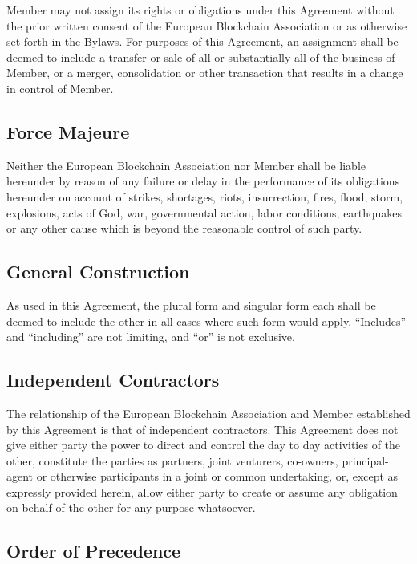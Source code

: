 \documentclass{article}
\begin{document}
Member may not assign its rights or obligations under this Agreement without the prior written consent of the European Blockchain Association or as otherwise set forth in the Bylaws. 
For purposes of this Agreement, an assignment shall be deemed to include a transfer or sale of all or substantially all of the business of Member, or a merger, consolidation or other transaction that results in a change in control of Member.

\subsection{Force Majeure}

Neither the European Blockchain Association nor Member shall be liable hereunder by reason of any failure or delay in the performance of its obligations hereunder on account of strikes, shortages, riots, insurrection, fires, flood, storm, explosions, acts of God, war, governmental action, labor conditions, earthquakes or any other cause which is beyond the reasonable control of such party.

\subsection{General Construction}

As used in this Agreement, the plural form and singular form each shall be deemed to include the other in all cases where such form would apply. “Includes” and “including” are not limiting, and “or” is not exclusive.

\subsection{Independent Contractors}

The relationship of the European Blockchain Association and Member established by this Agreement is that of independent contractors. 
This Agreement does not give either party the power to direct and control the day to day activities of the other, constitute the parties as partners, joint venturers, co-owners, principal-agent or otherwise participants in a joint or common undertaking, or, except as expressly provided herein, allow either party to create or assume any obligation on behalf of the other for any purpose whatsoever.

\subsection{Order of Precedence}
\end{document}
